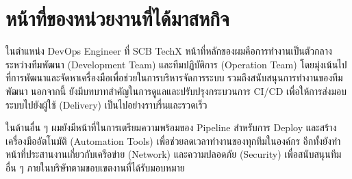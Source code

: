 \section{หน้าที่ของหน่วยงานที่ได้มาสหกิจ}
ในตำแหน่ง DevOps Engineer ที่ SCB TechX หน้าที่หลักของผมคือการทำงานเป็นตัวกลางระหว่างทีมพัฒนา (Development Team) และทีมปฏิบัติการ (Operation Team) โดยมุ่งเน้นไปที่การพัฒนาและจัดหาเครื่องมือเพื่อช่วยในการบริหารจัดการระบบ รวมถึงสนับสนุนการทำงานของทีมพัฒนา นอกจากนี้ ยังมีบทบาทสำคัญในการดูแลและปรับปรุงกระบวนการ CI/CD เพื่อให้การส่งมอบระบบไปยังผู้ใช้ (Delivery) เป็นไปอย่างราบรื่นและรวดเร็ว

ในด้านอื่น ๆ ผมยังมีหน้าที่ในการเตรียมความพร้อมของ Pipeline สำหรับการ Deploy และสร้างเครื่องมืออัตโนมัติ (Automation Tools) เพื่อช่วยลดเวลาทำงานของทุกทีมในองค์กร อีกทั้งยังทำหน้าที่ประสานงานเกี่ยวกับเครือข่าย (Network) และความปลอดภัย (Security) เพื่อสนับสนุนทีมอื่น ๆ ภายในบริษัทตามขอบเขตงานที่ได้รับมอบหมาย